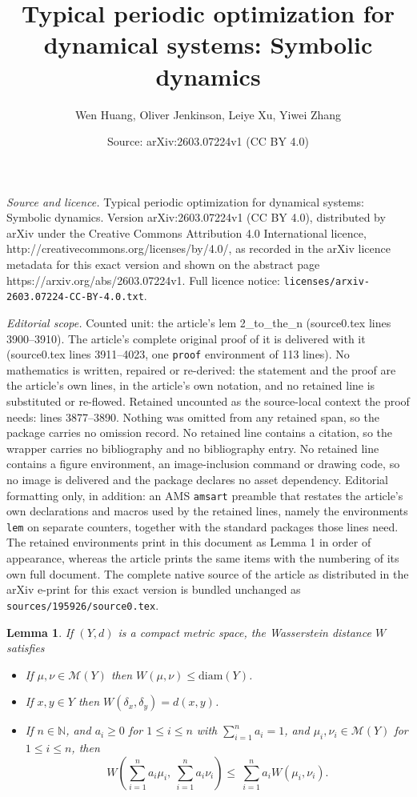 \documentclass[10pt,a4paper]{amsart}
\title{Typical periodic optimization for dynamical systems: Symbolic dynamics}
\author{Wen Huang, Oliver Jenkinson, Leiye Xu, Yiwei Zhang}
\date{Source: arXiv:2603.07224v1 (CC BY 4.0)}
\newtheorem{lem}{Lemma}
\def \N {\mathbb N}
\def\m{\mathcal M}
\begin{document}
\maketitle

\noindent\emph{Source and licence.} Typical periodic optimization for dynamical systems: Symbolic dynamics. Version arXiv:2603.07224v1 (CC BY 4.0), distributed by arXiv under the Creative Commons Attribution 4.0 International licence, http://creativecommons.org/licenses/by/4.0/, as recorded in the arXiv licence metadata for this exact version and shown on the abstract page https://arxiv.org/abs/2603.07224v1. Full licence notice: \texttt{licenses/arxiv-2603.07224-CC-BY-4.0.txt}.\par\smallskip

\noindent\textit{Editorial scope.} Counted unit: the article's lem 2\_to\_the\_n (source0.tex lines 3900--3910). The article's complete original proof of it is delivered with it (source0.tex lines 3911--4023, one \texttt{proof} environment of 113 lines). No mathematics is written, repaired or re-derived: the statement and the proof are the article's own lines, in the article's own notation, and no retained line is substituted or re-flowed.  Retained uncounted as the source-local context the proof needs: lines 3877--3890.  Nothing was omitted from any retained span, so the package carries no omission record.  No retained line contains a citation, so the wrapper carries no bibliography and no bibliography entry.  No retained line contains a figure environment, an image-inclusion command or drawing code, so no image is delivered and the package declares no asset dependency.  Editorial formatting only, in addition: an AMS \texttt{amsart} preamble that restates the article's own declarations and macros used by the retained lines, namely the environments \texttt{lem} on separate counters, together with the standard packages those lines need.  The retained environments print in this document as Lemma 1 in order of appearance, whereas the article prints the same items with the numbering of its own full document.  The complete native source of the article as distributed in the arXiv e-print for this exact version is bundled unchanged as \texttt{sources/195926/source0.tex}.
\begin{lem}\label{wasserstein_lemma}
If $(Y,d)$ is a compact metric space, the Wasserstein distance $W$ satisfies
\begin{itemize}
\item[(a)] If $\mu,\nu\in\m(Y)$ then $W(\mu,\nu)\le \text{diam}(Y)$.
\item[(b)] If $x,y\in Y$ then $W(\delta_x,\delta_y)=d(x,y)$.
\item[(c)] If $n\in\N$, and  $a_i\ge0$ for $1\le i\le n$ with $\sum_{i=1}^n a_i=1$,  and $\mu_i,\nu_i\in\m(Y)$  for $1\le i\le n$,
then 
$$
W\left( \sum_{i=1}^n a_i \mu_i, \ \sum_{i=1}^n a_i \nu_i \right)
\le \
\sum_{i=1}^n a_i  W(\mu_i, \nu_i ).
$$
\end{itemize}
\end{lem}
\end{document}
